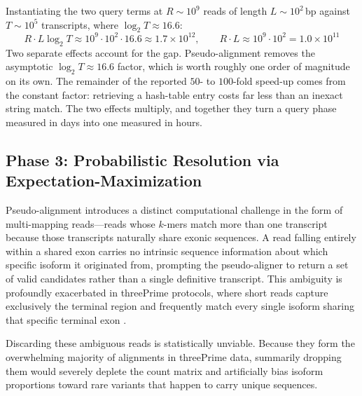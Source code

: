 Instantiating the two query terms at $R \sim 10^{9}$ reads of length $L \sim 10^{2}$\,bp against $T \sim 10^{5}$ transcripts, where $\log_2 T \approx 16.6$:
$$ R \cdot L \log_2 T \approx 10^{9} \cdot 10^{2} \cdot 16.6 \approx 1.7 \times 10^{12}, \qquad R \cdot L \approx 10^{9} \cdot 10^{2} = 1.0 \times 10^{11} $$
Two separate effects account for the gap. Pseudo-alignment removes the asymptotic $\log_2 T \approx 16.6$ factor, which is worth roughly one order of magnitude on its own. The remainder of the reported $50$- to $100$-fold speed-up comes from the constant factor: retrieving a hash-table entry costs far less than an inexact string match. The two effects multiply, and together they turn a query phase measured in days into one measured in hours.

\subsection{Phase 3: Probabilistic Resolution via Expectation-Maximization}

Pseudo-alignment introduces a distinct computational challenge in the form of multi-mapping reads---reads whose $k$-mers match more than one transcript because those transcripts naturally share exonic sequences. A read falling entirely within a shared exon carries no intrinsic sequence information about which specific isoform it originated from, prompting the pseudo-aligner to return a set of valid candidates rather than a single definitive transcript. This ambiguity is profoundly exacerbated in \gls{threePrime} protocols, where short reads capture exclusively the terminal region and frequently match every single isoform sharing that specific terminal exon \cite{galfre2021cotan}.

Discarding these ambiguous reads is statistically unviable. Because they form the overwhelming majority of alignments in \gls{threePrime} data, summarily dropping them would severely deplete the count matrix and artificially bias isoform proportions toward rare variants that happen to carry unique sequences.

